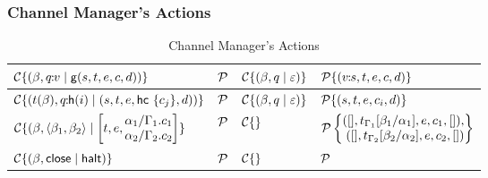 \documentclass[11pt]{article}
\newcommand{\<}{\langle}
\renewcommand{\>}{\rangle}
\begin{document}
\subsubsection{Channel Manager's Actions}{\label{channel-manager}} \label{ChanManAct}
\begin{table}[!h]
\begin{center}
\begin{tabular}{|l|l||l|l|} \hline
${\cal C}\{ (\beta , q\!\!:\!\!v \mid {\sf g}(s,t,e,c,d)) \}$ & ${\cal P}$ & ${\cal C}\{ (\beta,q \mid \varepsilon) \}$ & ${\cal P}\{(v\!\!:\!\! s,t,e,c,d)\}$ \\ \hline
${\cal C}\{ (t(\beta) , q\!\!:\!\!{\sf h}(i)  \mid (s,t,e,{\sf hc} ~\{ c_j \},d)) \}$ & ${\cal P}$ & ${\cal C}\{ (\beta,q \mid \varepsilon) \}$ & ${\cal P}\{(s,t,e,c_i,d)\}$ \\ \hline
${\cal C}\{ (\beta, \<\beta_1,\beta_2\> \mid \left[t,e,\!\!\!\begin{array}[c]{l} \alpha_1/\Gamma_1. c_1 \\ \alpha_2/\Gamma_2. c_2 \end{array} \!\!\!\right] \} $ & ${\cal P}$ 
                     & ${\cal C}\{ \}$ & ${\cal P}\left\{ \!\!\!\begin{array}{r} ([],t_{\Gamma_1}[\beta_1/\alpha_1],e,c_1,[]), \\
                                              ([],t_{\Gamma_2}[\beta_2/\alpha_2],e,c_2,[]) \end{array} \!\!\!\right\}$ \\ \hline
${\cal C}\{ (\beta,{\sf close}\mid {\sf halt} ) \}$ & ${\cal P}$ & ${\cal C}\{ \}$ & ${\cal P}$ \\ \hline
\end{tabular}
\caption{Channel Manager's Actions}
\label{channel-actions}
\end{center}
\end{table}
\end{document}
